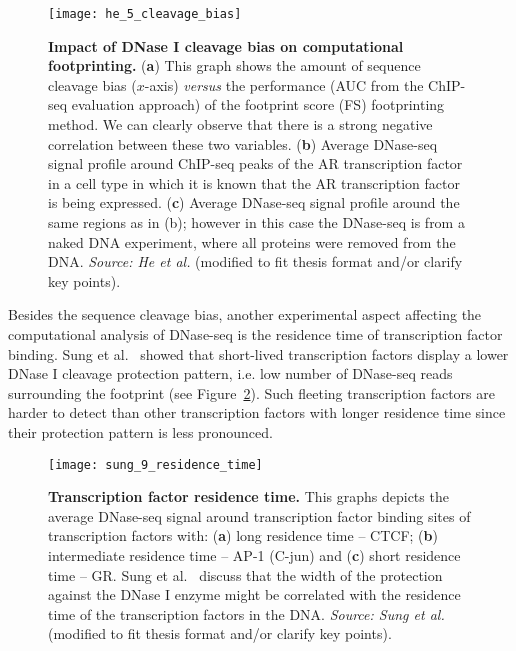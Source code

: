 \begin{figure}[h!]
\centering
\texttt{[image: he\_5\_cleavage\_bias]}
\caption[Impact of DNase I cleavage bias on computational footprinting]{\textbf{Impact of DNase I cleavage bias on computational footprinting.} (\textbf{a}) This graph shows the amount of sequence cleavage bias ($x$-axis) \emph{versus} the performance (AUC from the ChIP-seq evaluation approach) of the footprint score (FS) footprinting method. We can clearly observe that there is a strong negative correlation between these two variables. (\textbf{b}) Average DNase-seq signal profile around ChIP-seq peaks of the AR transcription factor in a cell type in which it is known that the AR transcription factor is being expressed. (\textbf{c}) Average DNase-seq signal profile around the same regions as in (b); however in this case the DNase-seq is from a naked DNA experiment, where all proteins were removed from the DNA. \emph{Source: He et al.}\cite{he2014} (modified to fit thesis format and/or clarify key points).}
\label{fig:he_cleavage_bias}
\end{figure}

Besides the sequence cleavage bias, another experimental aspect affecting the computational analysis of DNase-seq is the residence time of transcription factor binding. Sung et al.~\cite{sung2014} showed that short-lived transcription factors display a lower DNase I cleavage protection pattern, i.e. low number of DNase-seq reads surrounding the footprint (see Figure~\ref{fig:sung_residence_time}). Such fleeting transcription factors are harder to detect than other transcription factors with longer residence time since their protection pattern is less pronounced.

\begin{figure}[h!]
\centering
\texttt{[image: sung\_9\_residence\_time]}
\caption[Transcription factor residence time]{\textbf{Transcription factor residence time.} This graphs depicts the average DNase-seq signal around transcription factor binding sites of transcription factors with: (\textbf{a}) long residence time -- CTCF; (\textbf{b}) intermediate residence time -- AP-1 (C-jun) and (\textbf{c}) short residence time -- GR. Sung et al.~\cite{sung2014} discuss that the width of the protection against the DNase I enzyme might be correlated with the residence time of the transcription factors in the DNA. \emph{Source: Sung et al.}\cite{sung2014} (modified to fit thesis format and/or clarify key points).}
\label{fig:sung_residence_time}
\end{figure}

